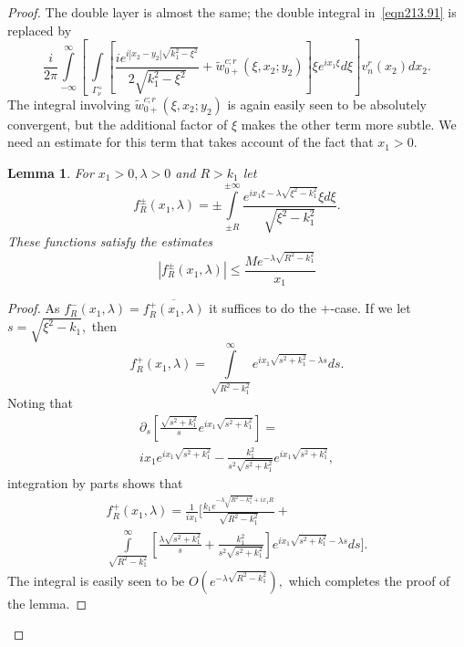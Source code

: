 \documentclass[11pt]{article}
\newcommand\tw{\tilde w_{0+}}
\newcommand\pa{\partial}
\newtheorem{lemma}{Lemma}
\theoremstyle{definition}
\theoremstyle{remark}
\begin{document}
\begin{proof}
   The double layer is almost the same; the double integral in~\eqref{eqn213.91} is
   replaced by
     \begin{equation}\label{eqn218.93}
    \frac{i}{2\pi}
    \int\limits_{-\infty}^{\infty}\left[\,\int\limits_{\Gamma_{\nu}^+}
    \left[\frac{ie^{i|x_2-y_2|\sqrt{k_1^2-\xi^2}}}{2\sqrt{k_1^2-\xi^2}}+
       \tw^{c;r}(\xi,x_2;y_2)\right]\xi e^{ix_1\xi}d\xi\right] v_n^{r}(x_2)dx_2.
     \end{equation}
     The integral involving $\tw^{c;r}(\xi,x_2;y_2)$ is again easily seen to be
     absolutely convergent, but the additional factor of $\xi$ makes the other
     term more subtle. We need an estimate for this term that takes account of
     the fact that $x_1>0.$
     \begin{lemma}
       For $x_1>0, \lambda>0$ and $R>k_1$ let
       \begin{equation}
       f^{\pm}_R(x_1,\lambda)=\pm\int\limits_{\pm R}^{\pm \infty}
       \frac{e^{ix_1\xi-\lambda\sqrt{\xi^2-k_1^2}}\xi d\xi}{\sqrt{\xi^2-k_1^2}}.
       \end{equation}
       These functions satisfy the estimates
       \begin{equation}
         |f^{\pm}_R(x_1,\lambda)|\leq \frac{Me^{-\lambda\sqrt{R^2-k_1^2}}}{x_1}
       \end{equation}
     \end{lemma}
     \begin{proof}
       As $f^-_R(x_1,\lambda)=\overline{f^+_R(x_1,\lambda)}$ it suffices to do the $+$-case.
       If we let $s=\sqrt{\xi^2-k_1},$ then
       \begin{equation}
         f^+_R(x_1,\lambda)=\int\limits_{\sqrt{R^2-k_1^2}}^{\infty}e^{ix_1\sqrt{s^2+k_1^2}-\lambda s}ds.
       \end{equation}
       Noting that
       \begin{multline}\label{eqn222.93}
         \pa_s\left[\frac{\sqrt{s^2+k_1^2}}{s}e^{ix_1\sqrt{s^2+k_1^2}}\right]=\\
         ix_1e^{ix_1\sqrt{s^2+k_1^2}}-\frac{k_1^2}{s^2\sqrt{s^2+k_1^2}}e^{ix_1\sqrt{s^2+k_1^2}},
       \end{multline}
       integration by parts shows that
       \begin{multline}
         f^+_R(x_1,\lambda)=
         \frac{1}{ix_1}\Bigg[
           \frac{k_1e^{-\lambda\sqrt{R^2-k_1^2}+ix_1R}}{\sqrt{R^2-k_1^2}}
           +\\
           \int\limits_{\sqrt{R^2-k_1^2}}^{\infty}\left[\frac{\lambda\sqrt{s^2+k_1^2}}{s}+
             \frac{k_1^2}{s^2\sqrt{s^2+k_1^2}}\right]e^{ix_1\sqrt{s^2+k_1^2}-\lambda
             s}ds\Bigg].
       \end{multline}
      The integral is easily seen to be $O(e^{-\lambda\sqrt{R^2-k_1^2}}),$ which
      completes the proof of the lemma.
     \end{proof}


\end{proof}
\end{document}
